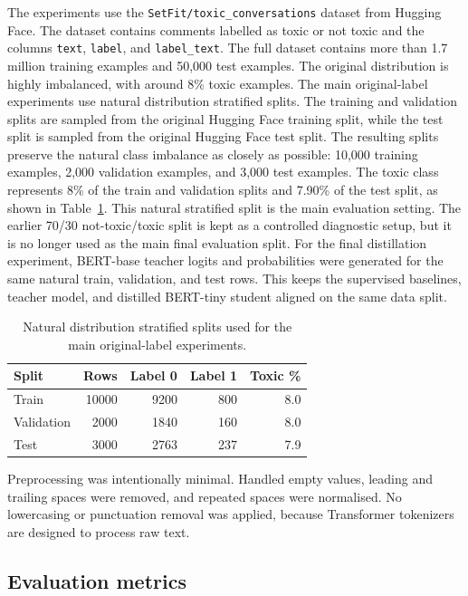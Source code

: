 \documentclass[pdflatex,sn-mathphys-num]{sn-jnl}
\begin{document}
The experiments use the \texttt{SetFit/toxic\_conversations} dataset from Hugging Face.
The dataset contains comments labelled as toxic or not toxic and the columns \texttt{text}, \texttt{label}, and \texttt{label\_text}. 
The full dataset contains more than 1.7 million training examples and 50,000 test examples.
The original distribution is highly imbalanced, with around 8\% toxic examples. 
The main original-label experiments use natural distribution stratified splits.
The training and validation splits are sampled from the original Hugging Face training split, while the test split is sampled from the original Hugging Face test split.
The resulting splits preserve the natural class imbalance as closely as possible: 10,000 training examples, 2,000 validation examples, and 3,000 test examples.
The toxic class represents 8\% of the train and validation splits and 7.90\% of the test split, as shown in Table~\ref{tab:natural-splits}.
This natural stratified split is the main evaluation setting.
The earlier 70/30 not-toxic/toxic split is kept as a controlled diagnostic setup, but it is no longer used as the main final evaluation split.
For the final distillation experiment, BERT-base teacher logits and probabilities were generated for the same natural train, validation, and test rows.
This keeps the supervised baselines, teacher model, and distilled BERT-tiny student aligned on the same data split.

\begin{table}[htbp]
\caption{Natural distribution stratified splits used for the main original-label experiments.}\label{tab:natural-splits}
\centering
\begin{tabular}{lrrrr}
\toprule
Split & Rows & Label 0 & Label 1 & Toxic \% \\
\midrule
Train & 10000 & 9200 & 800 & 8.0 \\
Validation & 2000 & 1840 & 160 & 8.0 \\
Test & 3000 & 2763 & 237 & 7.9 \\
\bottomrule
\end{tabular}
\end{table}

Preprocessing was intentionally minimal.
Handled empty values, leading and trailing spaces were removed, and repeated spaces were normalised. 
No lowercasing or punctuation removal was applied, because Transformer tokenizers are designed to process raw text.

\subsection{Evaluation metrics}
\end{document}
